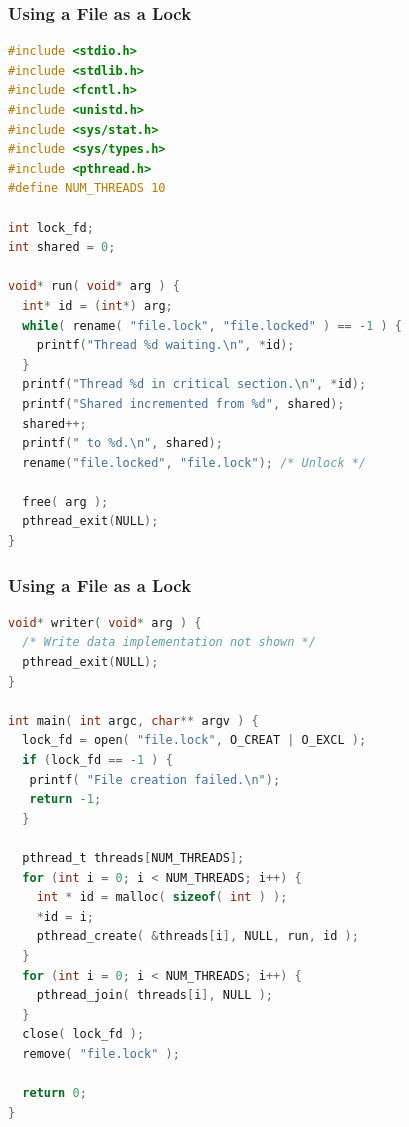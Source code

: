 \begin{frame}[fragile]
	\frametitle{Using a File as a Lock}
	\begin{lstlisting}[language=C]
#include <stdio.h>
#include <stdlib.h>
#include <fcntl.h>
#include <unistd.h>
#include <sys/stat.h>
#include <sys/types.h>
#include <pthread.h>
#define NUM_THREADS 10

int lock_fd;
int shared = 0;

void* run( void* arg ) {
  int* id = (int*) arg;
  while( rename( "file.lock", "file.locked" ) == -1 ) {
    printf("Thread %d waiting.\n", *id); 
  }
  printf("Thread %d in critical section.\n", *id);
  printf("Shared incremented from %d", shared);
  shared++;
  printf(" to %d.\n", shared);
  rename("file.locked", "file.lock"); /* Unlock */

  free( arg );
  pthread_exit(NULL);
}
\end{lstlisting}

\end{frame}

\begin{frame}[fragile]
	\frametitle{Using a File as a Lock}
	\begin{lstlisting}[language=C]
void* writer( void* arg ) {
  /* Write data implementation not shown */
  pthread_exit(NULL);
}

int main( int argc, char** argv ) {
  lock_fd = open( "file.lock", O_CREAT | O_EXCL );  
  if (lock_fd == -1 ) {
   printf( "File creation failed.\n");
   return -1;
  }

  pthread_t threads[NUM_THREADS];
  for (int i = 0; i < NUM_THREADS; i++) {
    int * id = malloc( sizeof( int ) );
    *id = i;
    pthread_create( &threads[i], NULL, run, id );
  }
  for (int i = 0; i < NUM_THREADS; i++) {
    pthread_join( threads[i], NULL );
  }
  close( lock_fd );
  remove( "file.lock" );

  return 0;
}
\end{lstlisting}
\end{frame}



